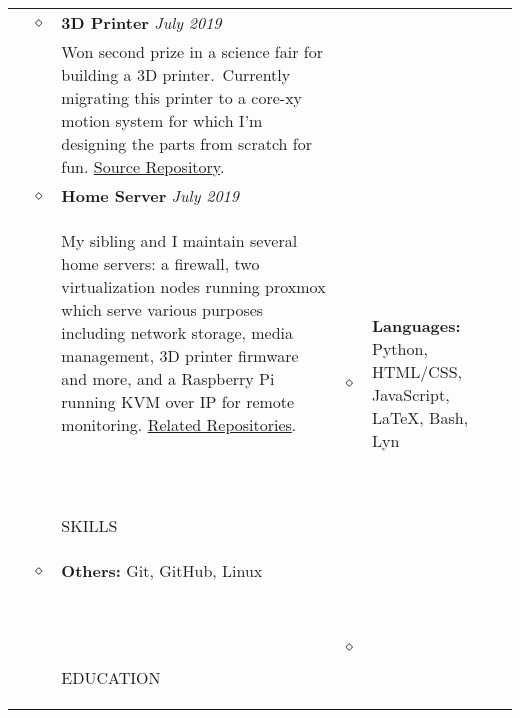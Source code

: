 \documentclass[11pt]{article}
\begin{document}
\begin{tabularx}{\textwidth}{@{}b{90px} b{9px}@{} X@{}}
        \\ & $\diamond$ &

        \textbf{3D Printer} \hfill \textit{July 2019} \\ & &
        Won second prize in a science fair for building a 3D printer.\ Currently migrating this printer to a core-xy
        motion system for which I'm designing the parts from scratch for fun.
        \href{https://github.com/xserv-labs/cad}{\color{blue}Source Repository}.

        \\ & $\diamond$ &

        \textbf{Home Server} \hfill \textit{July 2019} \\ & &
        My sibling and I maintain several home servers: a firewall, two virtualization nodes running proxmox which
        serve various purposes including network storage, media management, 3D printer firmware and more, and a
        Raspberry Pi running KVM over IP for remote monitoring.
        \href{https://github.com/xserv-labs}{\color{blue}Related Repositories}.\

        \iftoggle{lines}{\\ \\ \hline \\}{\\ \\}


        \lettrine[lines=1,loversize=-0.5]{S}KILLS & $\diamond$ &

        \textbf{Languages:} Python, HTML/CSS, JavaScript, \LaTeX, Bash, Lyn & &

        \\ & $\diamond$ &

        \textbf{Others:} Git, GitHub, Linux \\ & &

        \iftoggle{lines}{\\ \\ \hline \\}{\\ \\}


        \lettrine[lines=1,loversize=-0.5]{E}DUCATION & $\diamond$ &


\end{tabularx}
\end{document}
